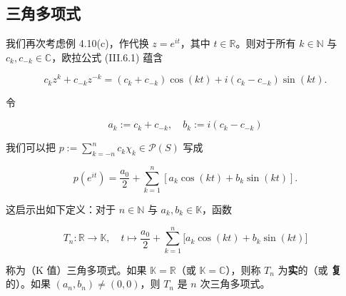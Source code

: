 \subsection*{三角多项式}

我们再次考虑例 4.10(c)，作代换  $z = e^{it}$，其中  $t \in \mathbb{R}$。则对于所有  $k \in \mathbb{N}$ 与  $c_k, c_{-k} \in \mathbb{C}$，欧拉公式 (III.6.1) 蕴含

\[
c_{k}z^{k}+c_{-k}z^{-k}=\left(c_{k}+c_{-k}\right)\cos(k t)+i\left(c_{k}-c_{-k}\right)\sin(k t).
\]

令

\begin{equation}
a_{k}:=c_{k}+c_{-k},\quad b_{k}:=i(c_{k}-c_{-k})
\end{equation}

我们可以把  $p := \sum_{k=-n}^{n} c_k \chi_k \in \mathcal{P}(S)$ 写成

\begin{equation}
p(e^{i t})=\frac{a_{0}}{2}+\sum_{k=1}^{n}\left[a_{k}\cos(k t)+b_{k}\sin(k t)\right].
\end{equation}

这启示出如下定义：对于  $n \in \mathbb{N}$ 与  $a_k, b_k \in \mathbb{K}$，函数

\begin{equation}
T_{n}\colon\mathbb{R}\to\mathbb{K},\quad t\mapsto\frac{a_{0}}{2}+\sum_{k=1}^{n}\bigl[a_{k}\operatorname{c o s}(k t)+b_{k}\operatorname{s i n}(k t)\bigr]
\end{equation}

称为（K 值）三角多项式。如果  $\mathbb{K} = \mathbb{R}$（或  $\mathbb{K} = \mathbb{C}$），则称  $T_n$ 为\textbf{实}的（或 \textbf{复}的）。如果  $(a_n, b_n) \neq (0, 0)$，则  $T_n$ 是  $n$ 次三角多项式。

